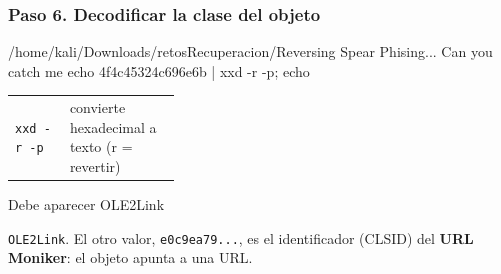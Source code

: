 \documentclass[11pt,a4paper]{article}
\begin{document}
\subsubsection*{Paso 6. Decodificar la clase del objeto}
\begin{comando}{/home/kali/Downloads/retosRecuperacion/Reversing Spear Phising... Can you catch me}
echo 4f4c45324c696e6b | xxd -r -p; echo
\end{comando}
\begin{tcolorbox}[enhanced, breakable, colback=gray!3, colframe=gray!35, boxrule=0.3pt, arc=1pt, left=4pt, right=4pt, top=2pt, bottom=2pt, fonttitle=\sffamily\scriptsize\bfseries, coltitle=black!70, colbacktitle=gray!10, title={Qué hace cada parte}, attach title to upper, before skip=2pt, after skip=4pt, fontupper=\small]
\par{\renewcommand{\arraystretch}{1.12}\begin{tabularx}{\linewidth}{@{}>{\raggedright\arraybackslash}p{0.33\linewidth}>{\raggedright\arraybackslash}X@{}}
\texttt{xxd -r -p} & convierte hexadecimal a texto (r = revertir) \\
\end{tabularx}}
\end{tcolorbox}
\begin{salida}{Debe aparecer}
OLE2Link
\end{salida}
\begin{nota}\texttt{OLE2Link}. El otro valor, \texttt{e0c9ea79...}, es el identificador (CLSID) del \textbf{URL Moniker}: el objeto apunta a una URL.\end{nota}
\end{document}
